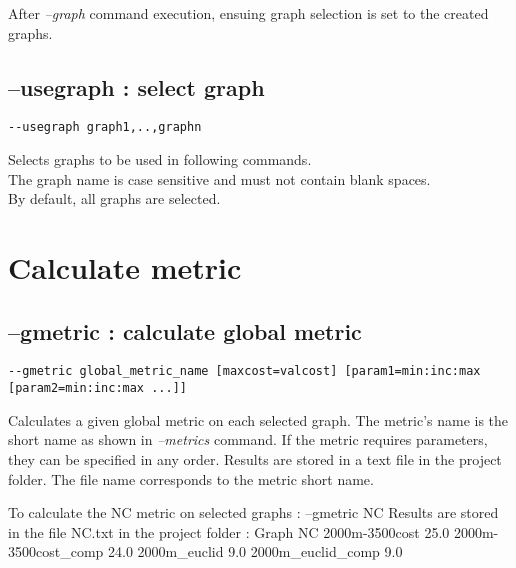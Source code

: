 \documentclass[a4paper,10pt]{report}
\newenvironment{cmd}
{\quote\Verbatim}
{\endVerbatim\endquote}
\begin{document}
After \textit{--graph} command execution, ensuing graph selection is set to the created graphs.

\subsection{--usegraph : select graph}
\begin{verbatim}
--usegraph graph1,..,graphn
\end{verbatim}
Selects graphs to be used in following commands.\\
The graph name is case sensitive and must not contain blank spaces.\\
By default, all graphs are selected.


\section{Calculate metric}

\subsection{--gmetric : calculate global metric}
\begin{verbatim}
--gmetric global_metric_name [maxcost=valcost] [param1=min:inc:max [param2=min:inc:max ...]]
\end{verbatim}
Calculates a given global metric on each selected graph. 
The metric's name is the short name as shown in \textit{--metrics} command.
If the metric requires parameters, they can be specified in any order.
Results are stored in a text file in the project folder. The file name corresponds to the metric short name.

To calculate the NC metric on selected graphs :
\begin{cmd}
--gmetric NC
\end{cmd}
Results are stored in the file NC.txt in the project folder :
\begin{cmd}
Graph                NC
2000m-3500cost       25.0
2000m-3500cost_comp  24.0
2000m_euclid         9.0
2000m_euclid_comp    9.0
\end{cmd}
\end{document}
